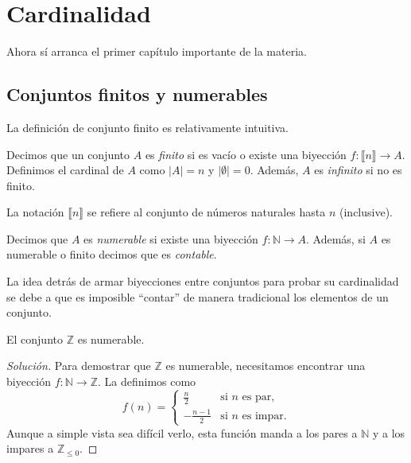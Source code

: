 \chapter{Cardinalidad}

Ahora sí arranca el primer capítulo importante de la materia.

\section{Conjuntos finitos y numerables}

La definición de conjunto finito es relativamente intuitiva.

\begin{definition}
	Decimos que un conjunto $A$ es \emph{finito} si es vacío o existe una biyección $f: \llbracket n \rrbracket \to  A$. Definimos el cardinal de $A$ como $\lvert A \rvert = n$ y $\lvert \emptyset \rvert = 0$. Además, $A$ es \emph{infinito} si no es finito.
\end{definition}

La notación $\llbracket n \rrbracket$ se refiere al conjunto de números naturales hasta $n$ (inclusive).

\begin{definition}
	Decimos que $A$ es \emph{numerable} si existe una biyección $f: \mathbb{N} \to  A$. Además, si $A$ es numerable o finito decimos que es \emph{contable}.
\end{definition}

La idea detrás de armar biyecciones entre conjuntos para probar su cardinalidad se debe a que es imposible ``contar'' de manera tradicional los elementos de un conjunto.

\begin{example}
	El conjunto $\mathbb{Z}$ es numerable.
\end{example}

\begin{proof}[Solución]
	Para demostrar que $\mathbb{Z}$ es numerable, necesitamos encontrar una biyección $f : \mathbb{N} \to \mathbb{Z}$. La definimos como
	\begin{equation*}
		f(n) = \begin{cases}
			\frac{n}{2}    & \text{si } n \text{ es par},   \\
			-\frac{n-1}{2} & \text{si } n \text{ es impar}.
		\end{cases}
	\end{equation*}
	Aunque a simple vista sea difícil verlo, esta función manda a los pares a $\mathbb{N}$ y a los impares a $\mathbb{Z}_{\leq 0}$.
\end{proof}

